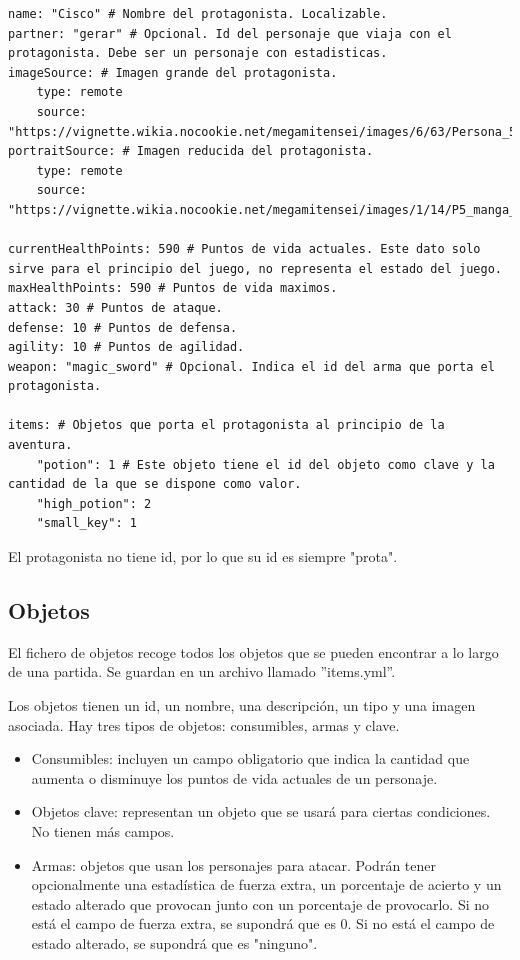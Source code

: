 \begin{lstlisting}
name: "Cisco" # Nombre del protagonista. Localizable.
partner: "gerar" # Opcional. Id del personaje que viaja con el protagonista. Debe ser un personaje con estadisticas.
imageSource: # Imagen grande del protagonista.
	type: remote
	source: "https://vignette.wikia.nocookie.net/megamitensei/images/6/63/Persona_5_Hero.png"
portraitSource: # Imagen reducida del protagonista.
	type: remote
	source: "https://vignette.wikia.nocookie.net/megamitensei/images/1/14/P5_manga_Akira.jpg"

currentHealthPoints: 590 # Puntos de vida actuales. Este dato solo sirve para el principio del juego, no representa el estado del juego.
maxHealthPoints: 590 # Puntos de vida maximos.
attack: 30 # Puntos de ataque.
defense: 10 # Puntos de defensa.
agility: 10 # Puntos de agilidad.
weapon: "magic_sword" # Opcional. Indica el id del arma que porta el protagonista.
	
items: # Objetos que porta el protagonista al principio de la aventura.
	"potion": 1 # Este objeto tiene el id del objeto como clave y la cantidad de la que se dispone como valor.
	"high_potion": 2
	"small_key": 1
\end{lstlisting}

El protagonista no tiene id, por lo que su id es siempre "prota".

\subsection{Objetos}
El fichero de objetos recoge todos los objetos que se pueden encontrar a lo largo de una partida. Se guardan en un archivo llamado ''items.yml''.

Los objetos tienen un id, un nombre, una descripción, un tipo y una imagen asociada. Hay tres tipos de objetos: consumibles, armas y clave.
\begin{itemize}
	\item Consumibles: incluyen un campo obligatorio que indica la cantidad que aumenta o disminuye los puntos de vida actuales de un personaje.
	\item Objetos clave: representan un objeto que se usará para ciertas condiciones. No tienen más campos.
	\item Armas: objetos que usan los personajes para atacar. Podrán tener opcionalmente una estadística de fuerza extra, un porcentaje de acierto y un estado alterado que provocan junto con un porcentaje de provocarlo. Si no está el campo de fuerza extra, se supondrá que es 0. Si no está el campo de estado alterado, se supondrá que es "ninguno". 
\end{itemize}

